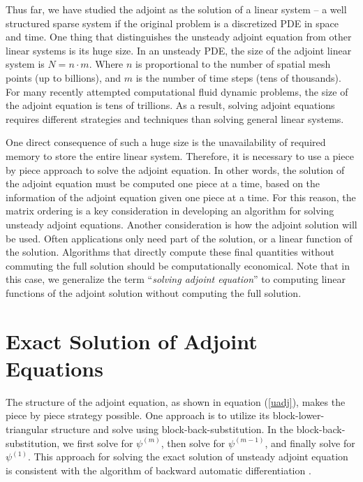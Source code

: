\documentclass[a4paper,11pt]{article}
\theoremstyle{remark}
\theoremstyle{definition}
\begin{document}
    Thus far, we have studied the adjoint as the solution of a linear
    system -- a well structured sparse system if the original problem is
    a discretized PDE in space and time.  One thing that distinguishes the
    unsteady adjoint equation from other linear systems is its huge size.
    In an unsteady PDE, the size of the adjoint linear system is
    $N = n \cdot m$.  Where $n$ is proportional to the number of spatial
    mesh points (up to billions), and $m$ is the number of time steps
    (tens of thousands).  For many recently attempted computational fluid
    dynamic problems, the size of the adjoint equation is tens of trillions.
    As a result, solving adjoint equations requires different strategies
    and techniques than solving general linear systems.
    
    One direct consequence of such a huge size is the unavailability of
    required memory to store the entire linear system.  Therefore, it is
    necessary to use a piece by piece approach to solve the adjoint equation.
    In other words, the solution of the adjoint equation must be computed one
    piece at a time, based on the information of the adjoint equation
    given one piece at a time.  For this reason, the matrix ordering is a key
    consideration in developing an algorithm for solving unsteady adjoint
    equations.  Another consideration is how the adjoint solution will be
    used.  Often applications only need part of the solution, or a linear
    function of the solution.  Algorithms that directly compute these
    final quantities without commuting the full solution should be
    computationally economical.  Note that in this case, we generalize the term
    ``\emph{solving adjoint equation}'' to computing linear functions of the
    adjoint solution without computing the full solution.





\section{Exact Solution of Adjoint Equations}
    The structure of the adjoint equation, as shown in equation
    (\ref{uadj}), makes the piece by piece strategy possible.  One
    approach is to utilize its block-lower-triangular structure and
    solve using block-back-substitution.  In the block-back-substitution,
    we first solve for $\psi^{(m)}$, then solve for $\psi^{(m-1)}$, and
    finally solve for $\psi^{(1)}$.  This approach for solving the exact
    solution of unsteady adjoint equation is consistent with the
    algorithm of backward automatic differentiation \cite{Griewank2003}.
    
\end{document}
